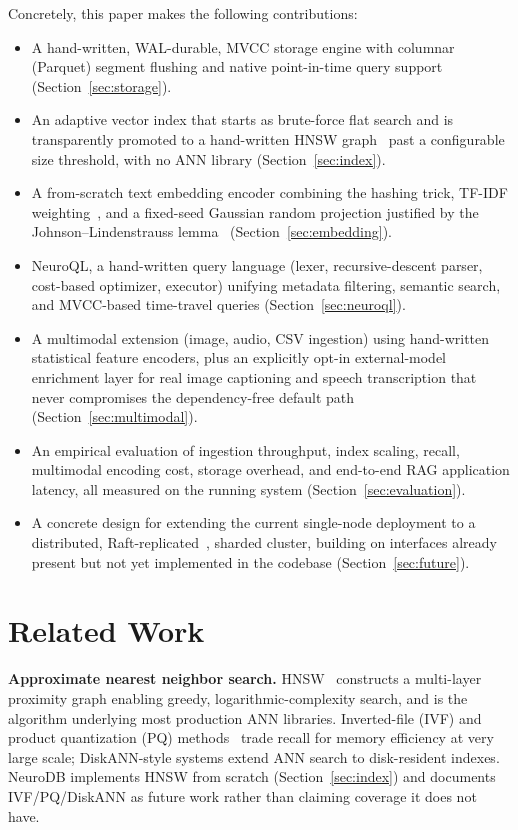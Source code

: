 \documentclass[conference]{IEEEtran}
\begin{document}
Concretely, this paper makes the following contributions:
\begin{itemize}
  \item A hand-written, WAL-durable, MVCC storage engine with columnar (Parquet) segment
    flushing and native point-in-time query support (Section~\ref{sec:storage}).
  \item An adaptive vector index that starts as brute-force flat search and is transparently
    promoted to a hand-written HNSW graph~\cite{malkov2018hnsw} past a configurable size
    threshold, with no ANN library (Section~\ref{sec:index}).
  \item A from-scratch text embedding encoder combining the hashing trick, TF-IDF
    weighting~\cite{salton1988tfidf}, and a fixed-seed Gaussian random projection justified
    by the Johnson--Lindenstrauss lemma~\cite{johnson1984extensions}
    (Section~\ref{sec:embedding}).
  \item NeuroQL, a hand-written query language (lexer, recursive-descent parser, cost-based
    optimizer, executor) unifying metadata filtering, semantic search, and MVCC-based
    time-travel queries (Section~\ref{sec:neuroql}).
  \item A multimodal extension (image, audio, CSV ingestion) using hand-written statistical
    feature encoders, plus an explicitly opt-in external-model enrichment layer for real
    image captioning and speech transcription that never compromises the dependency-free
    default path (Section~\ref{sec:multimodal}).
  \item An empirical evaluation of ingestion throughput, index scaling, recall, multimodal
    encoding cost, storage overhead, and end-to-end RAG application latency, all measured on
    the running system (Section~\ref{sec:evaluation}).
  \item A concrete design for extending the current single-node deployment to a distributed,
    Raft-replicated~\cite{ongaro2014raft}, sharded cluster, building on interfaces already
    present but not yet implemented in the codebase (Section~\ref{sec:future}).
\end{itemize}

\section{Related Work}
\label{sec:related}

\textbf{Approximate nearest neighbor search.} HNSW~\cite{malkov2018hnsw} constructs a
multi-layer proximity graph enabling greedy, logarithmic-complexity search, and is the
algorithm underlying most production ANN libraries. Inverted-file (IVF) and product
quantization (PQ) methods~\cite{johnson2019faiss} trade recall for memory efficiency at very
large scale; DiskANN-style systems extend ANN search to disk-resident indexes. NeuroDB
implements HNSW from scratch (Section~\ref{sec:index}) and documents IVF/PQ/DiskANN as
future work rather than claiming coverage it does not have.
\end{document}
